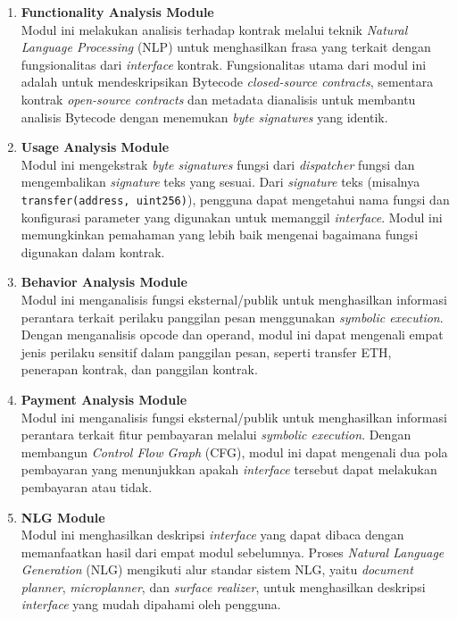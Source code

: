 \begin{enumerate}
  \item \textbf{Functionality Analysis Module} \\
  Modul ini melakukan analisis terhadap kontrak melalui teknik \textit{Natural Language Processing} (NLP) untuk menghasilkan frasa yang terkait dengan fungsionalitas dari \textit{interface} kontrak. Fungsionalitas utama dari modul ini adalah untuk mendeskripsikan Bytecode \textit{closed-source contracts}, sementara kontrak \textit{open-source contracts} dan metadata dianalisis untuk membantu analisis Bytecode dengan menemukan \textit{byte signatures} yang identik.

  \item \textbf{Usage Analysis Module} \\
  Modul ini mengekstrak \textit{byte signatures} fungsi dari \textit{dispatcher} fungsi dan mengembalikan \textit{signature} teks yang sesuai. Dari \textit{signature} teks (misalnya \texttt{transfer(address, uint256)}), pengguna dapat mengetahui nama fungsi dan konfigurasi parameter yang digunakan untuk memanggil \textit{interface}. Modul ini memungkinkan pemahaman yang lebih baik mengenai bagaimana fungsi digunakan dalam kontrak.

  \item \textbf{Behavior Analysis Module} \\
  Modul ini menganalisis fungsi eksternal/publik untuk menghasilkan informasi perantara terkait perilaku panggilan pesan menggunakan \textit{symbolic execution}. Dengan menganalisis opcode dan operand, modul ini dapat mengenali empat jenis perilaku sensitif dalam panggilan pesan, seperti transfer ETH, penerapan kontrak, dan panggilan kontrak.

  \item \textbf{Payment Analysis Module} \\
  Modul ini menganalisis fungsi eksternal/publik untuk menghasilkan informasi perantara terkait fitur pembayaran melalui \textit{symbolic execution}. Dengan membangun \textit{Control Flow Graph} (CFG), modul ini dapat mengenali dua pola pembayaran yang menunjukkan apakah \textit{interface} tersebut dapat melakukan pembayaran atau tidak.

  \item \textbf{NLG Module} \\
  Modul ini menghasilkan deskripsi \textit{interface} yang dapat dibaca dengan memanfaatkan hasil dari empat modul sebelumnya. Proses \textit{Natural Language Generation} (NLG) mengikuti alur standar sistem NLG, yaitu \textit{document planner}, \textit{microplanner}, dan \textit{surface realizer}, untuk menghasilkan deskripsi \textit{interface} yang mudah dipahami oleh pengguna.
\end{enumerate}

